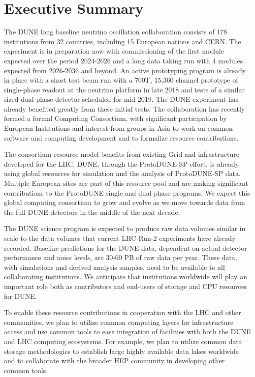 \section{Executive Summary}		
\label{ch:exec-comp-es}







The DUNE long baseline neutrino oscillation collaboration consists of 178 institutions from 32 countries, including 15 European nations and CERN. The experiment is in preparation now with commissioning of the first module expected over the period 2024-2026 and a long data taking run with 4 modules expected from 2026-2036 and beyond.  An active prototyping program is already in place with a short test beam run with a 700T, 15,360 channel prototype of single-phase readout at the neutrino platform  in late 2018 and tests of a similar sized dual-phase detector scheduled for mid-2019.   The DUNE experiment has already  benefited greatly from these initial tests.  The collaboration has recently formed a formal Computing Consortium, with significant participation by European Institutions and interest from groups in Asia to work on common software and computing development and to formalize resource contributions.

The consortium resource model benefits from existing Grid and  infrastructure developed for the LHC.  DUNE, through  the ProtoDUNE-SP effort, is already using global resources for simulation and the analysis of ProtoDUNE-SP data.  Multiple European sites are part of this resource pool and are making significant contributions to the ProtoDUNE single and dual phase programs.  We expect this global computing consortium to grow and evolve as we move towards data from the full DUNE detectors in the middle of the next decade.

The DUNE science program is expected to produce raw data volumes similar in scale to the data volumes that current LHC Run-2 experiments have already recorded.  Baseline predictions for the DUNE data, dependent on actual detector performance and noise levels, are 30-60 PB of raw data per year.  These data, with simulations and derived analysis samples, need to be available to all collaborating institutions.  We anticipate that institutions worldwide will play an important role both as contributors and end-users of storage and CPU resources for DUNE.

To enable these resource contributions in cooperation with the LHC and other communities, we plan to utilize common computing layers for infrastructure access and use common tools to ease integration of facilities with both the DUNE and LHC computing ecosystems.  For example, we plan to utilize common data storage methodologies to establish large highly available data lakes worldwide  and to collaborate with the broader HEP community in developing other common tools.

